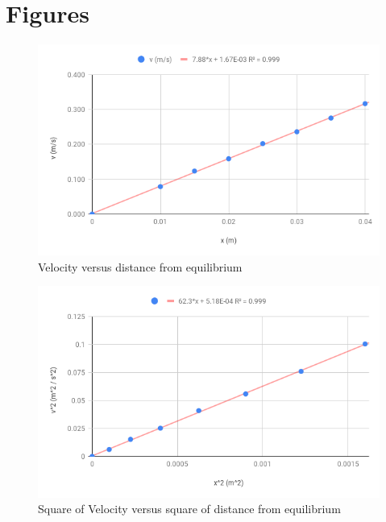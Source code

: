 \section{Figures}
\begin{figure}[ht]
    \centering
    \includegraphics[scale=0.71]{image/06-kinetic/v.png}
    \caption{Velocity versus distance from equilibrium}
    \label{figure:06.v}
\end{figure}
\begin{figure}[ht]
    \centering
    \includegraphics[scale=0.71]{image/06-kinetic/v2.png}
    \caption{Square of Velocity versus square of distance from equilibrium}
    \label{figure:06.v.2}
\end{figure}
